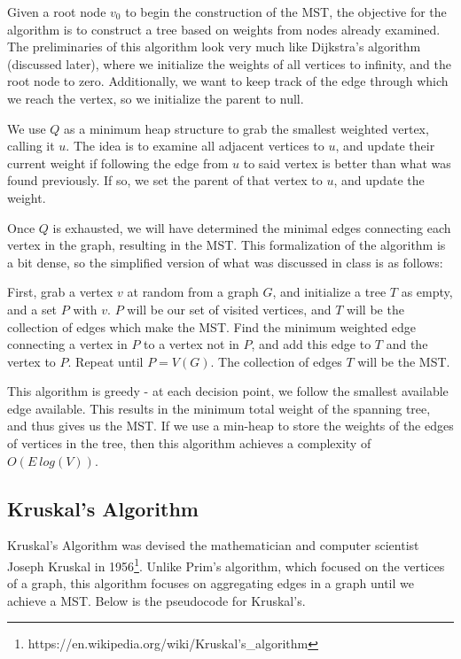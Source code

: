 Given a root node $v_0$ to begin the construction of the MST, the objective for the algorithm is to construct a tree based on weights from nodes already examined. The preliminaries of this algorithm look very much like Dijkstra's algorithm (discussed later), where we initialize the weights of all vertices to infinity, and the root node to zero. Additionally, we want to keep track of the edge through which we reach the vertex, so we initialize the parent to null. 

We use $Q$ as a minimum heap structure to grab the smallest weighted vertex, calling it $u$. The idea is to examine all adjacent vertices to $u$, and update their current weight if following the edge from $u$ to said vertex is better than what was found previously. If so, we set the parent of that vertex to $u$, and update the weight. 

Once $Q$ is exhausted, we will have determined the minimal edges connecting each vertex in the graph, resulting in the MST. This formalization of the algorithm is a bit dense, so the simplified version of what was discussed in class is as follows:

First, grab a vertex $v$ at random from a graph $G$, and initialize a tree $T$ as empty, and a set $P$ with $v$. $P$ will be our set of visited vertices, and $T$ will be the collection of edges which make the MST. Find the minimum weighted edge connecting a vertex in $P$ to a vertex not in $P$, and add this edge to $T$ and the vertex to $P$. Repeat until $P = V(G)$. The collection of edges $T$ will be the MST.

This algorithm is greedy - at each decision point, we follow the smallest available edge available. This results in the minimum total weight of the spanning tree, and thus gives us the MST. If we use a min-heap to store the weights of the edges of vertices in the tree, then this algorithm achieves a complexity of $O(E~log(V))$. 

\subsection{Kruskal's Algorithm}
Kruskal's Algorithm was devised the mathematician and computer scientist Joseph Kruskal in 1956\footnote{https://en.wikipedia.org/wiki/Kruskal's\_algorithm}. Unlike Prim's algorithm, which focused on the vertices of a graph, this algorithm focuses on aggregating edges in a graph until we achieve a MST. Below is the pseudocode for Kruskal's.

